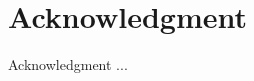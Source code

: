 \documentclass[journal]{IEEEtran}
\begin{document}


\section*{Acknowledgment}
Acknowledgment ...













{}
\end{document}
